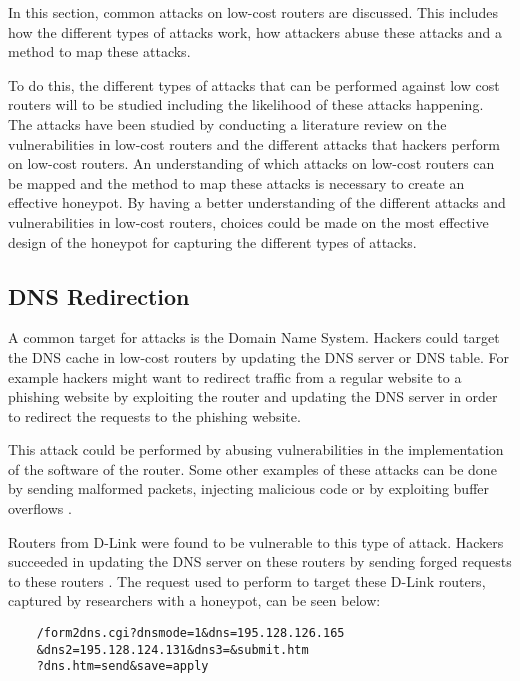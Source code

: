 In this section, common attacks on low-cost routers are discussed. This includes how the different types of attacks work, how attackers abuse these attacks and a method to map these attacks.

To do this, the different types of attacks that can be performed against low cost routers will to be studied including the likelihood of these attacks happening. The attacks have been studied by conducting a literature review on the vulnerabilities in low-cost routers and the different attacks that hackers perform on low-cost routers. An understanding of which attacks on low-cost routers can be mapped and the method to map these attacks is necessary to create an effective honeypot. By having a better understanding of the different attacks and vulnerabilities in low-cost routers, choices could be made on the most effective design of the honeypot for capturing the different types of attacks.

\subsection{DNS Redirection}
A common target for attacks is the Domain Name System. Hackers could target the DNS cache in low-cost routers by updating the DNS server or DNS table. For example hackers might want to redirect traffic from a regular website to a phishing website by exploiting the router and updating the DNS server in order to redirect the requests to the phishing website.

This attack could be performed by abusing vulnerabilities in the implementation of the software of the router. Some other examples of these attacks can be done by sending malformed packets, injecting malicious code or by exploiting buffer overflows \cite{DNSATTACK:NETSEC:2014}.

Routers from D-Link were found to be vulnerable to this type of attack. Hackers succeeded in updating the DNS server on these routers by sending forged requests to these routers \cite{DLINK:DNSHIJACK:2019}. The request used to perform to target these D-Link routers, captured by researchers with a honeypot, can be seen below:

\begin{verbatim}
    /form2dns.cgi?dnsmode=1&dns=195.128.126.165
    &dns2=195.128.124.131&dns3=&submit.htm
    ?dns.htm=send&save=apply
\end{verbatim}

